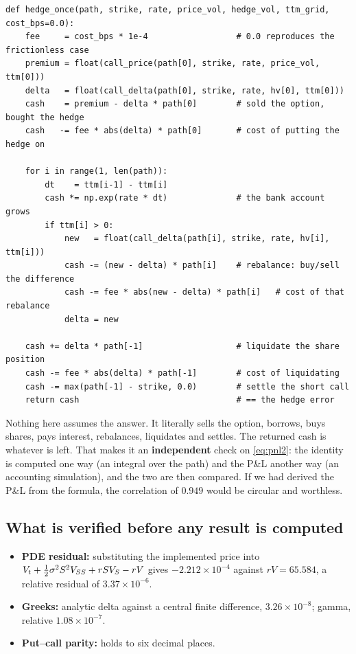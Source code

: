 \documentclass[11pt,a4paper]{article}
\begin{document}
\begin{lstlisting}[style=py]
def hedge_once(path, strike, rate, price_vol, hedge_vol, ttm_grid, cost_bps=0.0):
    fee     = cost_bps * 1e-4                  # 0.0 reproduces the frictionless case
    premium = float(call_price(path[0], strike, rate, price_vol, ttm[0]))
    delta   = float(call_delta(path[0], strike, rate, hv[0], ttm[0]))
    cash    = premium - delta * path[0]        # sold the option, bought the hedge
    cash   -= fee * abs(delta) * path[0]       # cost of putting the hedge on

    for i in range(1, len(path)):
        dt    = ttm[i-1] - ttm[i]
        cash *= np.exp(rate * dt)              # the bank account grows
        if ttm[i] > 0:
            new   = float(call_delta(path[i], strike, rate, hv[i], ttm[i]))
            cash -= (new - delta) * path[i]    # rebalance: buy/sell the difference
            cash -= fee * abs(new - delta) * path[i]   # cost of that rebalance
            delta = new

    cash += delta * path[-1]                   # liquidate the share position
    cash -= fee * abs(delta) * path[-1]        # cost of liquidating
    cash -= max(path[-1] - strike, 0.0)        # settle the short call
    return cash                                # == the hedge error
\end{lstlisting}

\begin{keybox}
Nothing here assumes the answer. It literally sells the option, borrows, buys shares, pays
interest, rebalances, liquidates and settles. The returned cash is whatever is left. That makes
it an \textbf{independent} check on \eqref{eq:pnl2}: the identity is computed one way (an
integral over the path) and the P\&L another way (an accounting simulation), and the two are
then compared. If we had derived the P\&L from the formula, the correlation of $0.949$ would be
circular and worthless.
\end{keybox}

\subsection{What is verified before any result is computed}

\begin{itemize}[leftmargin=*,topsep=1pt,itemsep=1pt]
\item \textbf{PDE residual:} substituting the implemented price into
      $V_t+\tfrac{1}{2}\sigma^2S^2V_{SS}+rSV_S-rV$ gives $-2.212\times10^{-4}$ against $rV=65.584$,
      a relative residual of $3.37\times10^{-6}$.
\item \textbf{Greeks:} analytic delta against a central finite difference, $3.26\times10^{-8}$;
      gamma, relative $1.08\times10^{-7}$.
\item \textbf{Put--call parity:} holds to six decimal places.
\end{itemize}
\end{document}
